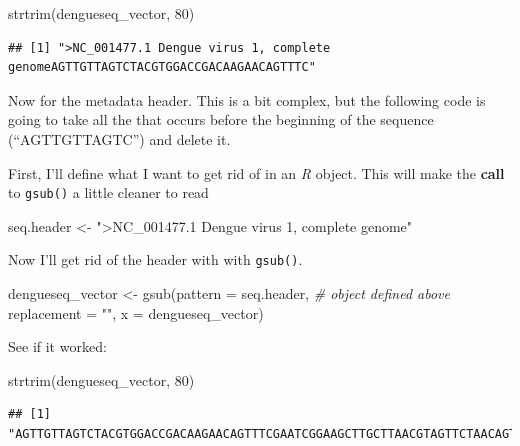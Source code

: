 \documentclass[
]{book}
\newenvironment{Shaded}{\begin{snugshade}}{\end{snugshade}}
\newcommand{\AttributeTok}[1]{\textcolor[rgb]{0.77,0.63,0.00}{#1}}
\newcommand{\CommentTok}[1]{\textcolor[rgb]{0.56,0.35,0.01}{\textit{#1}}}
\newcommand{\DecValTok}[1]{\textcolor[rgb]{0.00,0.00,0.81}{#1}}
\newcommand{\FunctionTok}[1]{\textcolor[rgb]{0.00,0.00,0.00}{#1}}
\newcommand{\NormalTok}[1]{#1}
\newcommand{\OtherTok}[1]{\textcolor[rgb]{0.56,0.35,0.01}{#1}}
\newcommand{\StringTok}[1]{\textcolor[rgb]{0.31,0.60,0.02}{#1}}
\begin{document}
\begin{Shaded}
\begin{Highlighting}[]
\FunctionTok{strtrim}\NormalTok{(dengueseq\_vector, }\DecValTok{80}\NormalTok{)}
\end{Highlighting}
\end{Shaded}

\begin{verbatim}
## [1] ">NC_001477.1 Dengue virus 1, complete genomeAGTTGTTAGTCTACGTGGACCGACAAGAACAGTTTC"
\end{verbatim}

Now for the metadata header. This is a bit complex, but the following code is going to take all the that occurs before the beginning of the sequence (``AGTTGTTAGTC'') and delete it.

First, I'll define what I want to get rid of in an \emph{R} object. This will make the \textbf{call} to \texttt{gsub()} a little cleaner to read

\begin{Shaded}
\begin{Highlighting}[]
\NormalTok{seq.header }\OtherTok{\textless{}{-}} \StringTok{"\textgreater{}NC\_001477.1 Dengue virus 1, complete genome"}
\end{Highlighting}
\end{Shaded}

Now I'll get rid of the header with with \texttt{gsub()}.

\begin{Shaded}
\begin{Highlighting}[]
\NormalTok{dengueseq\_vector }\OtherTok{\textless{}{-}} \FunctionTok{gsub}\NormalTok{(}\AttributeTok{pattern =}\NormalTok{ seq.header, }\CommentTok{\# object defined above}
                         \AttributeTok{replacement =} \StringTok{""}\NormalTok{, }
                         \AttributeTok{x =}\NormalTok{ dengueseq\_vector)}
\end{Highlighting}
\end{Shaded}

See if it worked:

\begin{Shaded}
\begin{Highlighting}[]
\FunctionTok{strtrim}\NormalTok{(dengueseq\_vector, }\DecValTok{80}\NormalTok{)}
\end{Highlighting}
\end{Shaded}

\begin{verbatim}
## [1] "AGTTGTTAGTCTACGTGGACCGACAAGAACAGTTTCGAATCGGAAGCTTGCTTAACGTAGTTCTAACAGTTTTTTATTAG"
\end{verbatim}
\end{document}
